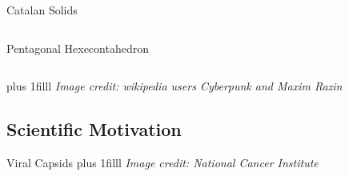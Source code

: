 \documentclass{beamer}
\newcommand{\btVFill}{\vskip0pt plus 1filll}
\begin{document}
\begin{frame}{Catalan Solids}
\begin{columns}
\begin{column}{0.32\textwidth}
      Pentagonal Hexecontahedron
     \end{column}
\end{columns}
\btVFill
\textit{\scriptsize Image credit: wikipedia users Cyberpunk and Maxim Razin}
\end{frame}
\subsection{Scientific Motivation}
\begin{frame}{Viral Capsids}
%
  \centering
\btVFill
\textit{\scriptsize Image credit: National Cancer Institute} 
\end{frame}
\end{document}
